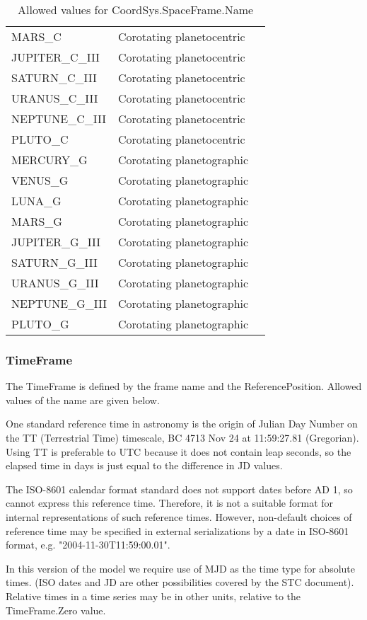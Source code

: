 \documentclass[11pt]{article}
\begin{document}
\begin{table}[h]
\begin{tabular}{|lll|}
MARS\_C & Corotating planetocentric & \\
JUPITER\_C\_III & Corotating planetocentric & \\
SATURN\_C\_III& Corotating planetocentric & \\
URANUS\_C\_III& Corotating planetocentric & \\
NEPTUNE\_C\_III& Corotating planetocentric & \\
PLUTO\_C  &Corotating planetocentric & \\
MERCURY\_G & Corotating planetographic&\\
VENUS\_G   & Corotating planetographic&\\
LUNA\_G & Corotating planetographic&\\
MARS\_G & Corotating planetographic&\\
JUPITER\_G\_III&Corotating planetographic&\\
SATURN\_G\_III&Corotating planetographic&\\
URANUS\_G\_III&Corotating planetographic&\\
NEPTUNE\_G\_III&Corotating planetographic&\\
PLUTO\_G&Corotating planetographic&\\
\hline
\end{tabular}
\caption{Allowed values for CoordSys.SpaceFrame.Name}
\end{table}


\subsubsection{TimeFrame}

The TimeFrame is defined by the frame name and the ReferencePosition.
Allowed values of the name are given below.

One standard reference time in astronomy is the origin 
of Julian Day Number on the TT (Terrestrial
Time) timescale, BC 4713 Nov  24 at 11:59:27.81 (Gregorian).
Using TT is preferable to UTC because it does not
contain leap seconds, so the elapsed time in days is just equal to the
difference in JD values.
  
The ISO-8601 calendar format standard
does not support dates before AD 1, so cannot express this reference
time. Therefore, it is not a suitable format for internal
representations of such reference times. However, non-default choices of 
reference time may be specified in external serializations
by a date in ISO-8601 format, e.g. "2004-11-30T11:59:00.01".
 
In this version of the model we require use of MJD as the time type
for absolute times.
(ISO dates and JD are other possibilities covered by the STC document).
Relative times in a time series may be in other units, relative to
the TimeFrame.Zero value.
\end{document}
